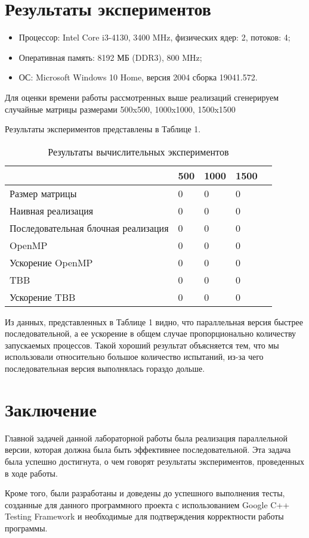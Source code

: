 \documentclass{report}
\begin{document}
\section*{Результаты экспериментов}
\begin{itemize}
\item Процессор: Intel Core i3-4130, 3400 MHz, физических ядер: 2, потоков: 4;
\item Оперативная память: 8192 МБ (DDR3), 800 MHz;
\item ОС: Microsoft Windows 10 Home, версия 2004 сборка 19041.572.
\end{itemize}

\par Для оценки времени работы рассмотренных выше реализаций сгенерируем случайные матрицы размерами 500x500, 1000x1000, 1500x1500
\par Результаты экспериментов представлены в Таблице 1.

\begin{table}[!h]
\caption{Результаты вычислительных экспериментов}
\renewcommand{\arraystretch}{1.8} 
\centering
\begin{tabular}{l*{4}{|l}}
\hline
& 500 & 1000 & 1500 \\
\hline
Размер матрицы & 0 & 0 & 0 \\
\hline
Наивная реализация & 0 & 0 & 0  \\
\hline
Последовательная блочная реализация & 0 & 0 & 0 \\
\hline
OpenMP & 0 & 0 & 0 \\
\hline
Ускорение OpenMP & 0 & 0 & 0 \\
\hline
TBB & 0 & 0 & 0 \\
\hline
Ускорение TBB & 0 & 0 & 0 \\
\end{tabular}
\end{table}

\par Из данных, представленных в Таблице 1 видно, что параллельная версия быстрее последовательной, а ее ускорение в общем случае пропорционально количеству запускаемых процессов. Такой хороший результат объясняется тем, что мы использовали относительно большое количество испытаний, из-за чего последовательная версия выполнялась гораздо дольше.
\newpage

\section*{Заключение}
\par Главной задачей данной лабораторной работы была реализация параллельной версии, которая должна была быть эффективнее последовательной. Эта задача была успешно достигнута, о чем говорят результаты экспериментов, проведенных в ходе работы.
\par Кроме того, были разработаны и доведены до успешного выполнения тесты, созданные для данного программного проекта с использованием Google C++ Testing Framework и необходимые для подтверждения корректности работы программы.
\newpage
\end{document}
